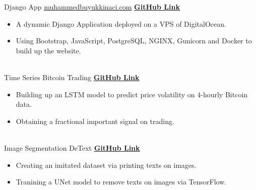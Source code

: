 \documentclass[letterpaper]{DS_class_file} %
\begin{document}
\begin{twenty} %
    
	\twentyitem
	{Django}
	{App}
	{\hspace{0.3cm}\href{https://muhammedbuyukkinaci.com}{muhammedbuyukkinaci.com}}
	{\href{https://github.com/MuhammedBuyukkinaci/muhammedbuyukkinaci.com}{\textbf{GitHub Link}}}
	{}
	{
		{\begin{itemize}
				\item A dynamic Django Application deployed on a VPS of DigitalOcean.
				\item Using Bootstrap, JavaScript, PostgreSQL, NGINX, Gunicorn and Docker to build up the website.
		\end{itemize}}
	}
	\\
	
	\twentyitem
	{Time}
	{Series}
	{\hspace{0.3cm}Bitcoin Trading}
	{\href{https://github.com/MuhammedBuyukkinaci/Bitcoin-Trading}{\textbf{GitHub Link}}}
	{}
	{
		{\begin{itemize}
				\item Building up an LSTM model to predict price volatility on 4-hourly Bitcoin data.
				\item Obtaining a fractional important signal on trading.
		\end{itemize}}
	}
	\\
	
	\twentyitem
	{Image}
	{Segmentation}
	{\hspace{0.3cm}DeText}
	{\href{https://github.com/MuhammedBuyukkinaci/DeText}{\textbf{GitHub Link}}}
	{}
	{
		{\begin{itemize}
				\item Creating an imitated dataset via printing texts on images.
				\item Tranining a UNet model to remove texts on images via TensorFlow.
		\end{itemize}}
	}
	\\
    

\end{twenty}
\end{document}
